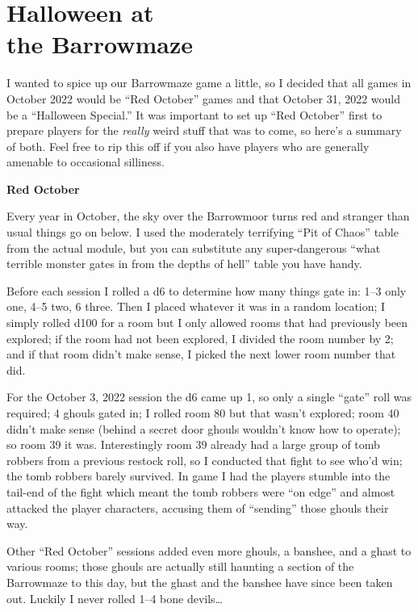 
\section{Halloween at\\ the Barrowmaze}
\label{halloween}
I wanted to spice up our Barrowmaze game a little, so I decided that all games
in October 2022 would be ``Red October'' games and that October 31, 2022 would
be a ``Halloween Special.'' It was important to set up ``Red October'' first to
prepare players for the \emph{really} weird stuff that was to come, so here's a
summary of both. Feel free to rip this off if you also have players who are
generally amenable to occasional silliness.

\textbf{Red October}

Every year in October, the sky over the Barrowmoor turns red and stranger than
usual things go on below. I used the moderately terrifying ``Pit of Chaos''
table from the actual module, but you can substitute any super-dangerous ``what
terrible monster gates in from the depths of hell'' table you have handy.

Before each session I rolled a d6 to determine how many things gate in: 1--3 only
one, 4--5 two, 6 three. Then I placed whatever it was in a random location; I
simply rolled d100 for a room but I only allowed rooms that had previously been
explored; if the room had not been explored, I divided the room number by 2; and
if that room didn't make sense, I picked the next lower room number that did.

For the October 3, 2022 session the d6 came up 1, so only a single ``gate'' roll
was required; 4 ghouls gated in; I rolled room 80 but that wasn't explored; room
40 didn't make sense (behind a secret door ghouls wouldn't know how to operate);
so room 39 it was.
%
Interestingly room 39 already had a large group of tomb robbers from a previous
restock roll, so I conducted that fight to see who'd win; the tomb robbers barely
survived. In game I had the players stumble into the tail-end of the fight which
meant the tomb robbers were ``on edge'' and almost attacked the player
characters, accusing them of ``sending'' those ghouls their way.

Other ``Red October'' sessions added even more ghouls, a banshee, and a ghast
to various rooms; those ghouls are actually still haunting a section of the
Barrowmaze to this day, but the ghast and the banshee have since been taken out.
Luckily I never rolled 1--4 bone devils\dots{}

